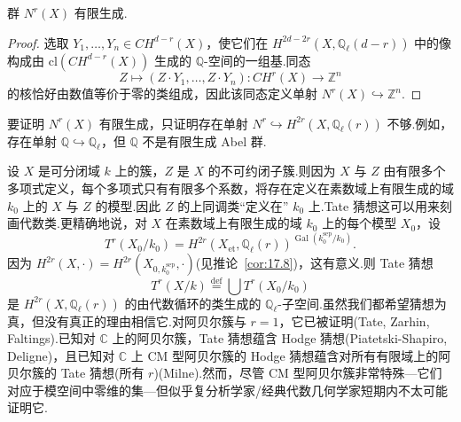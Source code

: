 \begin{theorem}\label{thm:23.6}
群 $N^{r}(X)$ 有限生成.
\end{theorem}

\begin{proof}
选取 $Y_1, \ldots, Y_n \in CH^{d-r}(X)$，使它们在 $H^{2d-2r}(X, \mathbb{Q}_{\ell}(d-r))$ 中的像构成由 $\mathrm{cl}(CH^{d-r}(X))$ 生成的 $\mathbb{Q}$-空间的一组基.同态
\[
Z \mapsto (Z \cdot Y_1, \ldots, Z \cdot Y_n) \colon CH^{r}(X) \to \mathbb{Z}^{n}
\]
的核恰好由数值等价于零的类组成，因此该同态定义单射 $N^{r}(X) \hookrightarrow \mathbb{Z}^{n}$.
\end{proof}

\begin{remark}\label{rem:23.7}
要证明 $N^{r}(X)$ 有限生成，只证明存在单射 $N^{r} \hookrightarrow H^{2r}(X, \mathbb{Q}_{\ell}(r))$ 不够.例如，存在单射 $\mathbb{Q} \hookrightarrow \mathbb{Q}_{\ell}$，但 $\mathbb{Q}$ 不是有限生成 Abel 群.
\end{remark}

设 $X$ 是可分闭域 $k$ 上的簇，$Z$ 是 $X$ 的不可约闭子簇.则因为 $X$ 与 $Z$ 由有限多个多项式定义，每个多项式只有有限多个系数，将存在定义在素数域上有限生成的域 $k_0$ 上的 $X$ 与 $Z$ 的模型.因此 $Z$ 的上同调类``定义在'' $k_0$ 上.Tate 猜想这可以用来刻画代数类.更精确地说，对 $X$ 在素数域上有限生成的域 $k_0$ 上的每个模型 $X_0$，设
\[
T^{r}(X_0/k_0) = H^{2r}(X_{\mathrm{et}}, \mathbb{Q}_{\ell}(r))^{\operatorname{Gal}(k^{\mathrm{sep}}_0/k_0)}.
\]
因为 $H^{2r}(X, \cdot) = H^{2r}(X_{0, k^{\mathrm{sep}}_0}, \cdot)$(见推论~\ref{cor:17.8})，这有意义.则 Tate 猜想
\[
T^{r}(X/k) \overset{\mathrm{def}}{=} \bigcup T^{r}(X_0/k_0)
\]
是 $H^{2r}(X, \mathbb{Q}_{\ell}(r))$ 的由代数循环的类生成的 $\mathbb{Q}_{\ell}$-子空间.虽然我们都希望猜想为真，但没有真正的理由相信它.对阿贝尔簇与 $r = 1$，它已被证明(Tate, Zarhin, Faltings).已知对 $\mathbb{C}$ 上的阿贝尔簇，Tate 猜想蕴含 Hodge 猜想(Piatetski-Shapiro, Deligne)，且已知对 $\mathbb{C}$ 上 CM 型阿贝尔簇的 Hodge 猜想蕴含对所有有限域上的阿贝尔簇的 Tate 猜想(所有 $r$)(Milne).然而，尽管 CM 型阿贝尔簇非常特殊---它们对应于模空间中零维的集---但似乎复分析学家/经典代数几何学家短期内不太可能证明它.
